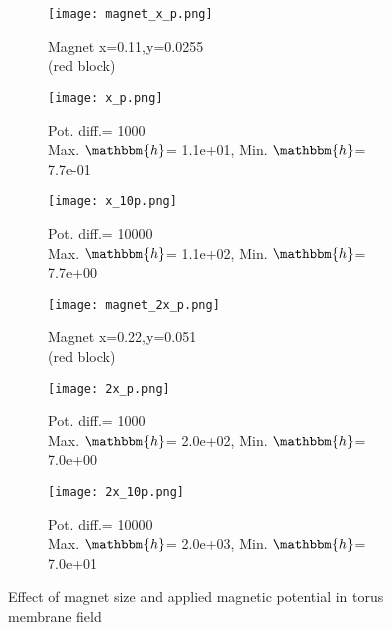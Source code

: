 \begin{figure}[h]
\centering
\begin{subfigure}{0.32\textwidth}
\centering
\texttt{[image: magnet\_x\_p.png]}
\caption{\scriptsize Magnet x=0.11,y=0.0255 \\(red block)}
\label{fig:1.5.1}
\end{subfigure}
\begin{subfigure}{0.33\textwidth}
\centering
\texttt{[image: x\_p.png]}
\caption{\scriptsize Pot. diff.= 1000 \\ Max. $\mathbbm{h}$= 1.1e+01, Min. $\mathbbm{h}$= 7.7e-01}
\label{fig:1.5.2}
\end{subfigure}
\begin{subfigure}{0.33\textwidth}
\centering
\texttt{[image: x\_10p.png]}
\caption{\scriptsize Pot. diff.= 10000 \\ Max. $\mathbbm{h}$= 1.1e+02, Min. $\mathbbm{h}$= 7.7e+00}
\label{fig:1.5.3}
\end{subfigure}
\vspace{0.5cm}
\begin{subfigure}{0.32\textwidth}
\centering
\texttt{[image: magnet\_2x\_p.png]}
\caption{\scriptsize Magnet x=0.22,y=0.051 \\(red block)}
\label{fig:1.5.4}
\end{subfigure}
\begin{subfigure}{0.33\textwidth}
\centering
\texttt{[image: 2x\_p.png]}
\caption{\scriptsize Pot. diff.= 1000 \\ Max. $\mathbbm{h}$= 2.0e+02, Min. $\mathbbm{h}$= 7.0e+00}
\label{fig:1.5.5}
\end{subfigure}
\begin{subfigure}{0.33\textwidth}
\centering
\texttt{[image: 2x\_10p.png]}
\caption{\scriptsize Pot. diff.= 10000 \\ Max. $\mathbbm{h}$= 2.0e+03, Min. $\mathbbm{h}$= 7.0e+01}
\label{fig:1.5.6}
\end{subfigure}
\caption{Effect of magnet size and applied magnetic potential in torus membrane field}
\label{fig:1.5}
\end{figure}

